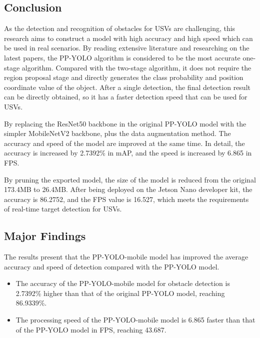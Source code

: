 \documentclass[sensors,article,submit,moreauthors,pdftex]{Definitions/mdpi}
\begin{document}
\begin{paracol}{2}
\section{Conclusion}


As the detection and recognition of obstacles for USVs are challenging, this research aims to construct a model with high accuracy and high speed which can be used in real scenarios. By reading extensive literature and researching on the latest papers, the PP-YOLO algorithm is considered to be the most accurate one-stage algorithm. Compared with the two-stage algorithm, it does not require the region proposal stage and directly generates the class probability and position coordinate value of the object. After a single detection, the final detection result can be directly obtained, so it has a faster detection speed that can be used for USVs.

By replacing the ResNet50 backbone in the original PP-YOLO model with the simpler MobileNetV2 backbone, plus the data augmentation method. The accuracy and speed of the model are improved at the same time. In detail, the accuracy is increased by 2.7392\% in mAP, and the speed is increased by 6.865 in FPS.

By pruning the exported model, the size of the model is reduced from the original 173.4MB to 26.4MB. After being deployed on the Jetson Nano developer kit, the accuracy is 86.2752, and the FPS value is 16.527, which meets the requirements of real-time target detection for USVs.

\subsection{Major Findings}
The results present that the PP-YOLO-mobile model has improved the average accuracy and speed of detection compared with the PP-YOLO model.

\begin{itemize}
\item{The accuracy of the PP-YOLO-mobile model for obstacle detection is 2.7392\% higher than that of the original PP-YOLO model, reaching 86.9339\%.}
\end{itemize}

\begin{itemize}
\item{The processing speed of the PP-YOLO-mobile model is 6.865 faster than that of the PP-YOLO model in FPS, reaching 43.687.}

\end{itemize}


\end{paracol}
\end{document}
